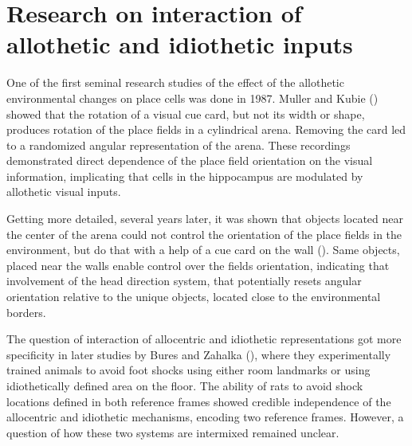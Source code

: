 \section{Research on interaction of allothetic and idiothetic inputs}
\label{sec:interaction_allo_idio}

One of the first seminal research studies of the effect of the allothetic environmental changes on place cells was done in 1987. Muller and Kubie (\cite{Muller1987}) showed that the rotation of a visual cue card, but not its width or shape, produces rotation of the place fields in a cylindrical arena. Removing the card led to a randomized angular representation of the arena. These recordings demonstrated direct dependence of the place field orientation on the visual information, implicating that cells in the hippocampus are modulated by allothetic visual inputs.

Getting more detailed, several years later, it was shown that objects located near the center of the arena could not control the orientation of the place fields in the environment, but do that with a help of a cue card on the wall (\cite{Cressant1997}). Same objects, placed near the walls enable control over the fields orientation, indicating that involvement of the head direction system, that potentially resets angular orientation relative to the unique objects, located close to the environmental borders.

The question of interaction of allocentric and idiothetic representations got more specificity in later studies by Bures and Zahalka (\cite{Bures1998}), where they experimentally trained animals to avoid foot shocks using either room landmarks or using idiothetically defined area on the floor. The ability of rats to avoid shock locations defined in both reference frames showed credible independence of the allocentric and idiothetic mechanisms, encoding two reference frames. However, a question of how these two systems are intermixed remained unclear.

